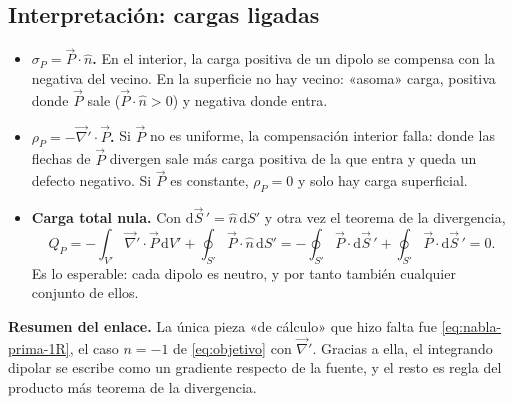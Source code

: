 \documentclass[11pt,a4paper]{article}
\numberwithin{equation}{section}
\newcommand{\vc}[1]{\vec{#1}}
\newcommand{\nab}{\vec{\nabla}}
\begin{document}
\subsection{Interpretación: cargas ligadas}
\begin{itemize}
  \item \textbf{$\sigma_P=\vc{P}\cdot\hat n$.} En el interior, la carga
        positiva de un dipolo se compensa con la negativa del vecino. En la
        superficie no hay vecino: «asoma» carga, positiva donde $\vc{P}$ sale
        ($\vc{P}\cdot\hat n>0$) y negativa donde entra.
  \item \textbf{$\rho_P=-\nab'\cdot\vc{P}$.} Si $\vc{P}$ no es uniforme, la
        compensación interior falla: donde las flechas de $\vc{P}$ divergen
        sale más carga positiva de la que entra y queda un defecto negativo.
        Si $\vc{P}$ es constante, $\rho_P=0$ y solo hay carga superficial.
  \item \textbf{Carga total nula.} Con $\mathrm d\vc{S}\,'=\hat n\,\mathrm dS'$
        y otra vez el teorema de la divergencia,
        \begin{equation}\label{eq:QP}
          Q_P=-\int_{V'}\nab'\cdot\vc{P}\,\mathrm dV'
          +\oint_{S'}\vc{P}\cdot\hat n\,\mathrm dS'
          =-\oint_{S'}\vc{P}\cdot\mathrm d\vc{S}\,'
          +\oint_{S'}\vc{P}\cdot\mathrm d\vc{S}\,'=0 .
        \end{equation}
        Es lo esperable: cada dipolo es neutro, y por tanto también cualquier
        conjunto de ellos.
\end{itemize}

\textbf{Resumen del enlace.} La única pieza «de cálculo» que hizo falta fue
\eqref{eq:nabla-prima-1R}, el caso $n=-1$ de \eqref{eq:objetivo} con $\nab'$.
Gracias a ella, el integrando dipolar se escribe como un gradiente respecto
de la fuente, y el resto es regla del producto más teorema de la divergencia.
\end{document}
